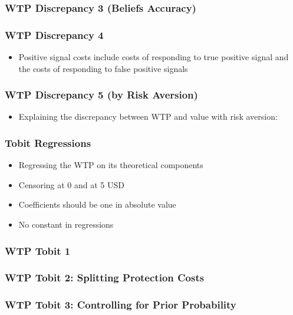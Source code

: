 \documentclass[11pt,hyperref={bookmarks=false}]{beamer}
\begin{document}
\begin{frame}
\frametitle{WTP Discrepancy 3 (Beliefs Accuracy)}
\footnotesize

\normalsize
\end{frame}





\begin{frame}
\frametitle{WTP Discrepancy 4}
\begin{itemize}
\item Positive signal costs include costs of responding to true positive signal and the costs of responding to false positive signals
\end{itemize}
\footnotesize

\normalsize
\end{frame}



\begin{frame}
\frametitle{WTP Discrepancy 5 (by Risk Aversion)}
\begin{itemize}
\item Explaining the discrepancy between WTP and value with risk aversion:
\end{itemize}
\footnotesize

\end{frame}

\begin{frame}
\frametitle{Tobit Regressions}
\Large
\begin{itemize}
\item Regressing the WTP on its theoretical components
\item Censoring at 0 and at 5 USD
\item Coefficients should be one in absolute value
\item No constant in regressions
\end{itemize}
\normalsize
\end{frame}


\begin{frame}
\frametitle{WTP Tobit 1}

\footnotesize

\normalsize
\end{frame}


\begin{frame}
\frametitle{WTP Tobit 2: Splitting Protection Costs}

\footnotesize

\normalsize
\end{frame}


\begin{frame}
\frametitle{WTP Tobit 3: Controlling for Prior Probability}

\footnotesize

\normalsize
\end{frame}
\end{document}
